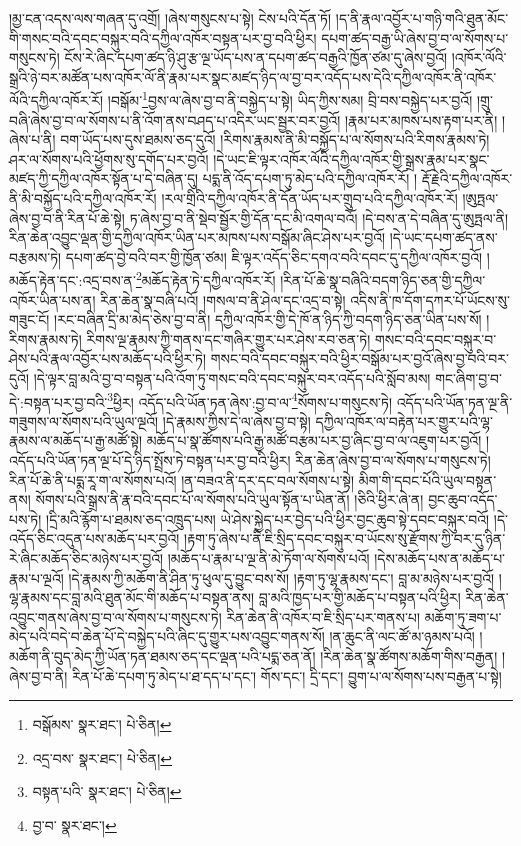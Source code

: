 །མྱ་ངན་འདས་ལས་གཞན་དུ་འགྲོ། །ཞེས་གསུངས་པ་སྟེ། ངེས་པའི་དོན་ཏོ། །ད་ནི་རྣལ་འབྱོར་པ་གཉི་གའི་ཐུན་མོང་གི་གསང་བའི་དབང་བསྐུར་བའི་དཀྱིལ་འཁོར་བསྟན་པར་བྱ་བའི་ཕྱིར། དཔག་ཚད་བརྒྱ་ཡི་ཞེས་བྱ་བ་ལ་སོགས་པ་གསུངས་ཏེ། ངོས་རེ་ཞིང་དཔག་ཚད་ཉི་ཤུ་རྩ་ལྔ་ཡོད་པས་ན་དཔག་ཚད་བརྒྱའི་ཁྱོན་ཙམ་དུ་ཞེས་བྱའོ། །འཁོར་ལོའི་སྒྲའི་ཉེ་བར་མཚོན་པས་འཁོར་ལོ་ནི་རྣམ་པར་སྣང་མཛད་ཉིད་ལ་བྱ་བར་འདོད་པས་དེའི་དཀྱིལ་འཁོར་ནི་འཁོར་ལོའི་དཀྱིལ་འཁོར་རོ། །བསྒོམ་\footnote{བསྒོམས་  སྣར་ཐང་།  པེ་ཅིན། }བྱས་ལ་ཞེས་བྱ་བ་ནི་བསྐྱེད་པ་སྟེ། ཡིད་ཀྱིས་སམ། བྲི་བས་བསྐྱེད་པར་བྱའོ། །གྲུ་བཞི་ཞེས་བྱ་བ་ལ་སོགས་པ་ནི་འོག་ནས་བཤད་པ་འདིར་ཡང་སྦྱར་བར་བྱའོ། །རྣམ་པར་མཁས་པས་རྟག་པར་ནི། །ཞེས་པ་ནི། བག་ཡོད་པས་དུས་ཐམས་ཅད་དུའོ། །རིགས་རྣམས་ནི་མི་བསྐྱོད་པ་ལ་སོགས་པའི་རིགས་རྣམས་ཏེ། ཤར་ལ་སོགས་པའི་ཕྱོགས་སུ་དགོད་པར་བྱའོ། །དེ་ཡང་ཇི་ལྟར་འཁོར་ལོའི་དཀྱིལ་འཁོར་གྱི་སྒྲས་རྣམ་པར་སྣང་མཛད་ཀྱི་དཀྱིལ་འཁོར་སྟོན་པ་དེ་བཞིན་དུ། པདྨ་ནི་འོད་དཔག་ཏུ་མེད་པའི་དཀྱིལ་འཁོར་རོ། །
རྡོ་རྗེའི་དཀྱིལ་འཁོར་ནི་མི་བསྐྱོད་པའི་དཀྱིལ་འཁོར་རོ། །རལ་གྲིའི་དཀྱིལ་འཁོར་ནི་དོན་ཡོད་པར་གྲུབ་པའི་དཀྱིལ་འཁོར་རོ། །ཨུཏྤལ་ཞེས་བྱ་བ་ནི་རིན་པོ་ཆེ་སྟེ། ཏ་ཞེས་བྱ་བ་ནི་སྡེབ་སྦྱོར་གྱི་དོན་དང་མི་འགལ་བའོ། །དེ་བས་ན་དེ་བཞིན་དུ་ཨུཏྤལ་ནི། རིན་ཆེན་འབྱུང་ལྡན་གྱི་དཀྱིལ་འཁོར་ཡིན་པར་མཁས་པས་བསྒོམ་ཞིང་ཤེས་པར་བྱའོ། །དེ་ཡང་དཔག་ཚད་ནས་བརྩམས་ཏེ། དཔག་ཚད་བྱེ་བའི་བར་གྱི་ཁྱོན་ཙམ། ཇི་ལྟར་འདོད་ཅིང་དགའ་བའི་དབང་དུ་དཀྱིལ་འཁོར་བྱའོ། །མཆོད་རྟེན་དང་:འདྲ་བས་ན་\footnote{འདྲ་བས་  སྣར་ཐང་།  པེ་ཅིན། }མཆོད་རྟེན་ཏེ་དཀྱིལ་འཁོར་རོ། །རིན་པོ་ཆེ་སྣ་བཞིའི་བདག་ཉིད་ཅན་གྱི་དཀྱིལ་འཁོར་ཡིན་པས་ན། རིན་ཆེན་སྣ་བཞི་པའོ། །གསལ་བ་ནི་ཤེལ་དང་འདྲ་བ་སྟེ། འདིས་ནི་ཁ་དོག་དཀར་པོ་ཡོངས་སུ་གཟུང་ངོ། །རང་བཞིན་དྲི་མ་མེད་ཅེས་བྱ་བ་ནི། དཀྱིལ་འཁོར་གྱི་དེ་ཁོ་ན་ཉིད་ཀྱི་བདག་ཉིད་ཅན་ཡིན་པས་སོ། །རིགས་རྣམས་ཏེ། རིགས་ལྔ་རྣམས་ཀྱི་གནས་དང་གཞིར་གྱུར་པར་ཤེས་རབ་ཅན་ཏེ། གསང་བའི་དབང་བསྐུར་བ་ཤེས་པའི་རྣལ་འབྱོར་པས་མཆོད་པའི་ཕྱིར་ཏེ། གསང་བའི་དབང་བསྐུར་བའི་ཕྱིར་བསྒོམ་པར་བྱའོ་ཞེས་བྱ་བའི་བར་དུའོ། །དེ་ལྟར་བླ་མའི་བྱ་བ་བསྟན་པའི་འོག་ཏུ་གསང་བའི་དབང་བསྐུར་བར་འདོད་པའི་སློབ་མས། གང་ཞིག་བྱ་བ་དེ་:བསྟན་པར་བྱ་བའི་\footnote{བསྟན་པའི་  སྣར་ཐང་།  པེ་ཅིན། }ཕྱིར། འདོད་པའི་ཡོན་ཏན་ཞེས་:བྱ་བ་ལ་\footnote{བྱ་བ་  སྣར་ཐང་། }སོགས་པ་གསུངས་ཏེ། འདོད་པའི་ཡོན་ཏན་ལྔ་ནི་གཟུགས་ལ་སོགས་པའི་ཡུལ་ལྔའོ། །དེ་རྣམས་ཀྱིས་དེ་ལ་ཞེས་བྱ་བ་སྟེ། དཀྱིལ་འཁོར་ལ་བརྟེན་པར་གྱུར་པའི་ལྷ་རྣམས་ལ་མཆོད་པ་རྒྱ་མཚོ་སྟེ། མཆོད་པ་སྣ་ཚོགས་པའི་རྒྱ་མཚོ་བརྩམ་པར་བྱ་ཞིང་བྱ་བ་ལ་འཇུག་པར་བྱའོ། །འདོད་པའི་ཡོན་ཏན་ལྔ་པོ་དེ་ཉིད་སྤྲོས་ཏེ་བསྟན་པར་བྱ་བའི་ཕྱིར། རིན་ཆེན་ཞེས་བྱ་བ་ལ་སོགས་པ་གསུངས་ཏེ། རིན་པོ་ཆེ་ནི་པདྨ་རཱ་ག་ལ་སོགས་པའོ། །ན་བཟའ་ནི་དར་དང་བལ་སོགས་པ་སྟེ། མིག་གི་དབང་པོའི་ཡུལ་བསྟན་ནས། སོགས་པའི་སྒྲས་ནི་རྣ་བའི་དབང་པོ་ལ་སོགས་པའི་ཡུལ་སྟོན་པ་ཡིན་ནོ། །ཅིའི་ཕྱིར་ཞེ་ན། བྱང་ཆུབ་འདོད་པས་ཏེ། །དྲི་མའི་རྙོག་པ་ཐམས་ཅད་འཁྲུད་པས། ཡེ་ཤེས་སྐྱེད་པར་བྱེད་པའི་ཕྱིར་བྱང་ཆུབ་སྟེ་དབང་བསྐུར་བའོ། །དེ་འདོད་ཅིང་འདུན་པས་མཆོད་པར་བྱའོ། །རྟག་ཏུ་ཞེས་པ་ནི་ཇི་སྲིད་དབང་བསྐུར་བ་ཡོངས་སུ་རྫོགས་ཀྱི་བར་དུ་ཉིན་རེ་ཞིང་མཆོད་ཅིང་མཉེས་པར་བྱའོ། །མཆོད་པ་རྣམ་པ་ལྔ་ནི་མེ་ཏོག་ལ་སོགས་པའོ། །དེས་མཆོད་པས་ན་མཆོད་པ་རྣམ་པ་ལྔའོ། །དེ་རྣམས་ཀྱི་མཆོག་ནི་ཤིན་ཏུ་ཕུལ་དུ་བྱུང་བས་སོ། །རྟག་ཏུ་ལྷ་རྣམས་དང་། བླ་མ་མཉེས་པར་བྱའོ། །ལྷ་རྣམས་དང་བླ་མའི་ཐུན་མོང་གི་མཆོད་པ་བསྟན་ནས། བླ་མའི་ཁྱད་པར་གྱི་མཆོད་པ་བསྟན་པའི་ཕྱིར། རིན་ཆེན་འབྱུང་གནས་ཞེས་བྱ་བ་ལ་སོགས་པ་གསུངས་ཏེ། རིན་ཆེན་ནི་འཁོར་བ་ཇི་སྲིད་པར་གནས་པ། མཆོག་ཏུ་ཟག་པ་མེད་པའི་བདེ་བ་ཆེན་པོ་དེ་བསྐྱེད་པའི་ཞིང་དུ་གྱུར་པས་འབྱུང་གནས་སོ། །ན་ཆུང་ནི་ལང་ཚོ་མ་ཉམས་པའོ། །མཆོག་ནི་བུད་མེད་ཀྱི་ཡོན་ཏན་ཐམས་ཅད་དང་ལྡན་པའི་པདྨ་ཅན་ནོ། །རིན་ཆེན་སྣ་ཚོགས་མཆོག་གིས་བརྒྱན། །ཞེས་བྱ་བ་ནི། རིན་པོ་ཆེ་དཔག་ཏུ་མེད་པ་ཐ་དད་པ་དང་། གོས་དང་། དྲི་དང་། བྱུག་པ་ལ་སོགས་པས་བརྒྱན་པ་སྟེ། 